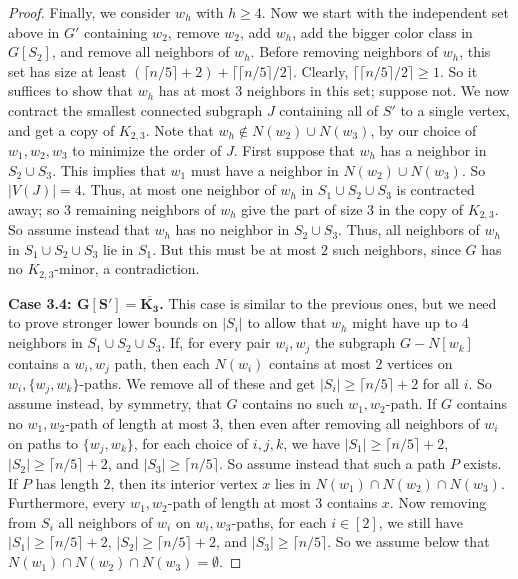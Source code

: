 \documentclass[10pt,a4paper]{amsart}
\newcommand\ceil[1]{\lceil#1\rceil}
\renewcommand\ge\geqslant
\begin{document}
\begin{proof}
Finally, we consider $w_h$ with $h\ge 4$.  Now we start with the independent set above in $G'$ containing $w_2$, remove $w_2$, add $w_h$, add the bigger color class in $G[S_2]$, and remove all neighbors of $w_h$.  Before removing neighbors of $w_h$, this set has size at least $(\ceil{n/5}+2)+\ceil{\ceil{n/5}/2}$. 
Clearly, $\ceil{\ceil{n/5}/2}\ge 1$.
So it suffices to show that $w_h$ has at most $3$ neighbors in this set; suppose not.  We now contract the smallest connected subgraph $J$ containing
all of $S'$ to a single vertex, and get a copy of $K_{2,3}$.  Note that $w_h\notin N(w_2)\cup N(w_3)$, by our choice of $w_1,w_2,w_3$ to minimize the 
order of $J$.  First suppose that $w_h$ has a neighbor in $S_2\cup S_3$.  This implies that $w_1$ must have a neighbor in $N(w_2)\cup N(w_3)$.
So $|V(J)|=4$.  Thus, at most one neighbor of $w_h$ in $S_1\cup S_2\cup S_3$ is contracted away; so $3$ remaining neighbors of $w_h$ give the part of 
size $3$ in the copy of $K_{2,3}$.  So assume instead that $w_h$ has no neighbor in $S_2\cup S_3$.  Thus, all neighbors of $w_h$ in $S_1\cup S_2\cup S_3$
lie in $S_1$.  But this must be at most $2$ such neighbors, since $G$ has no $K_{2,3}$-minor, a contradiction.

\textbf{Case 3.4: $\bm{G[S']=\overline{K_3}}$.}
This case is similar to the previous ones, but we need to prove stronger lower bounds on $|S_i|$ to allow that $w_h$ might have up to $4$ neighbors in
$S_1\cup S_2\cup S_3$.  
If, for every pair $w_i,w_j$ the subgraph $G-N[w_k]$ contains a $w_i,w_j$ path, then each $N(w_i)$ contains at most $2$ vertices on $w_i,\{w_j,w_k\}$-paths.
We remove all of these and get $|S_i|\ge \ceil{n/5}+2$ for all $i$.  So assume instead, by symmetry, that $G$ contains no such $w_1,w_2$-path. 
If $G$ contains no $w_1,w_2$-path of length at most $3$, then even after removing all neighbors of $w_i$ on paths to $\{w_j,w_k\}$, for each choice of $i,j,k$,
we have $|S_1|\ge \ceil{n/5}+2$, $|S_2|\ge \ceil{n/5}+2$, and $|S_3|\ge \ceil{n/5}$.  So assume instead that such a path $P$ exists.  If $P$ has length $2$,
then its interior vertex $x$ lies in $N(w_1)\cap N(w_2)\cap N(w_3)$.  Furthermore, every $w_1,w_2$-path of length at most $3$ contains $x$.  Now removing
from $S_i$ all neighbors of $w_i$ on $w_i,w_3$-paths, for each $i\in [2]$, we still have 
$|S_1|\ge \ceil{n/5}+2$, $|S_2|\ge \ceil{n/5}+2$, and $|S_3|\ge \ceil{n/5}$.
So we assume below that $N(w_1)\cap N(w_2)\cap N(w_3) = \emptyset$.



\end{proof}
\end{document}
